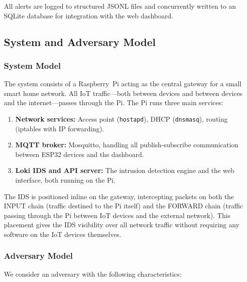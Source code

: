 \documentclass[12pt,a4paper]{article}
\begin{document}
All alerts are logged to structured JSONL files and concurrently written to an SQLite database for integration with the web dashboard.

\subsection{System and Adversary Model}
\label{sec:models}

\subsubsection*{System Model}

The system consists of a Raspberry~Pi acting as the central gateway for a small smart home network. All IoT traffic---both between devices and between devices and the internet---passes through the Pi. The Pi runs three main services:

\begin{enumerate}
    \item \textbf{Network services:} Access point (\texttt{hostapd}), DHCP (\texttt{dnsmasq}), routing (iptables with IP forwarding).
    \item \textbf{MQTT broker:} Mosquitto, handling all publish-subscribe communication between ESP32 devices and the dashboard.
    \item \textbf{Loki IDS and API server:} The intrusion detection engine and the web interface, both running on the Pi.
\end{enumerate}

The IDS is positioned inline on the gateway, intercepting packets on both the INPUT chain (traffic destined to the Pi itself) and the FORWARD chain (traffic passing through the Pi between IoT devices and the external network). This placement gives the IDS visibility over all network traffic without requiring any software on the IoT devices themselves.

\subsubsection*{Adversary Model}

We consider an adversary with the following characteristics:
\end{document}
